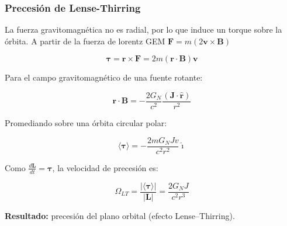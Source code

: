 \documentclass[aspectratio=169,10pt,usenames,dvipsnames,spanish]{beamer}
\begin{document}
\begin{frame}
\frametitle{Precesión de Lense-Thirring}

La fuerza gravitomagnética no es radial, por lo que induce un torque sobre la órbita. A partir de la fuerza de lorentz GEM $\mathbf{F}=m(2\mathbf{v}\times\mathbf{B})$

\begin{equation*}
\boldsymbol{\tau}=\mathbf{r}\times\mathbf{F}
=2m(\mathbf{r}\cdot\mathbf{B})\mathbf{v}
\end{equation*}

Para el campo gravitomagnético de una fuente rotante:

\begin{equation*}
\mathbf{r}\cdot\mathbf{B}
=-\frac{2G_N}{c^2}\frac{(\mathbf{J}\cdot\hat{\mathbf{r}})}{r^2}
\end{equation*}

Promediando sobre una órbita circular polar:

\begin{equation*}
\langle \boldsymbol{\tau} \rangle 
= -\frac{2 m G_N J v}{c^2 r^2} \hat{\imath}
\end{equation*}

Como $\frac{d\mathbf{L}}{dt}=\boldsymbol{\tau}$, la velocidad de precesión es:

\begin{equation*}
\Omega_{LT}=\frac{|\langle \boldsymbol{\tau} \rangle|}{|\mathbf{L}|}
=\frac{2G_N J}{c^2 r^3}
\end{equation*}

\textbf{Resultado:} precesión del plano orbital (efecto Lense–Thirring).
\end{frame}

\end{document}
